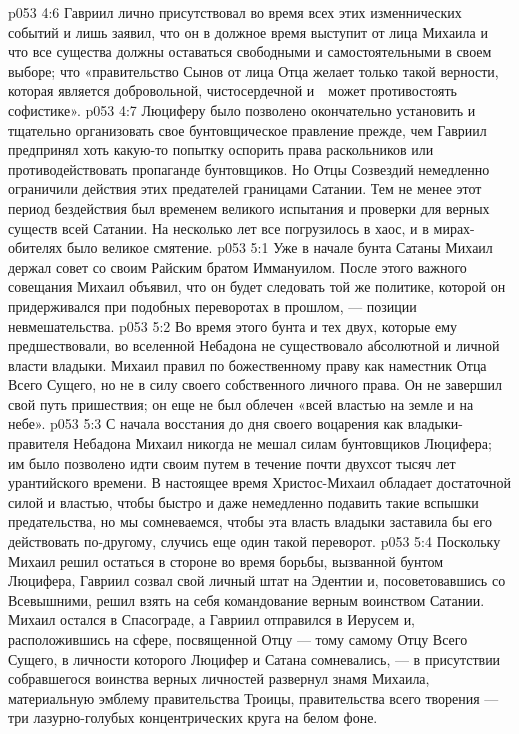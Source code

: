 \vs p053 4:6 Гавриил лично присутствовал во время всех этих изменнических событий и лишь заявил, что он в должное время выступит от лица Михаила и что все существа должны оставаться свободными и самостоятельными в своем выборе; что «правительство Сынов от лица Отца желает только такой верности, которая является добровольной, чистосердечной и　может противостоять софистике».
\vs p053 4:7 \pc Люциферу было позволено окончательно установить и тщательно организовать свое бунтовщическое правление прежде, чем Гавриил предпринял хоть какую\hyp{}то попытку оспорить права раскольников или противодействовать пропаганде бунтовщиков. Но Отцы Созвездий немедленно ограничили действия этих предателей границами Сатании. Тем не менее этот период бездействия был временем великого испытания и проверки для верных существ всей Сатании. На несколько лет все погрузилось в хаос, и в мирах\hyp{}обителях было великое смятение.
\vs p053 5:1 Уже в начале бунта Сатаны Михаил держал совет со своим Райским братом Иммануилом. После этого важного совещания Михаил объявил, что он будет следовать той же политике, которой он придерживался при подобных переворотах в прошлом, --- позиции невмешательства.
\vs p053 5:2 \pc Во время этого бунта и тех двух, которые ему предшествовали, во вселенной Небадона не существовало абсолютной и личной власти владыки. Михаил правил по божественному праву как наместник Отца Всего Сущего, но не в силу своего собственного личного права. Он не завершил свой путь пришествия; он еще не был облечен «всей властью на земле и на небе».
\vs p053 5:3 С начала восстания до дня своего воцарения как владыки\hyp{}правителя Небадона Михаил никогда не мешал силам бунтовщиков Люцифера; им было позволено идти своим путем в течение почти двухсот тысяч лет урантийского времени. В настоящее время Христос\hyp{}Михаил обладает достаточной силой и властью, чтобы быстро и даже немедленно подавить такие вспышки предательства, но мы сомневаемся, чтобы эта власть владыки заставила бы его действовать по\hyp{}другому, случись еще один такой переворот.
\vs p053 5:4 \pc Поскольку Михаил решил остаться в стороне во время борьбы, вызванной бунтом Люцифера, Гавриил созвал свой личный штат на Эдентии и, посоветовавшись со Всевышними, решил взять на себя командование верным воинством Сатании. Михаил остался в Спасограде, а Гавриил отправился в Иерусем и, расположившись на сфере, посвященной Отцу --- тому самому Отцу Всего Сущего, в личности которого Люцифер и Сатана сомневались, --- в присутствии собравшегося воинства верных личностей развернул знамя Михаила, материальную эмблему правительства Троицы, правительства всего творения --- три лазурно\hyp{}голубых концентрических круга на белом фоне.
